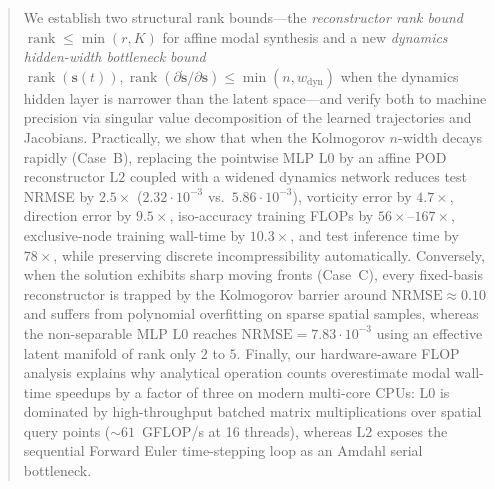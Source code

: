 \documentclass[10pt,a4paper]{article}
\newcommand{\NRMSE}{\mathrm{NRMSE}}
\begin{document}
\begin{abstract}
We establish two structural rank bounds---the \emph{reconstructor rank bound} $\operatorname{rank}\le\min(r,K)$ for affine modal synthesis and a new \emph{dynamics hidden-width bottleneck bound} $\operatorname{rank}(\mathbf{s}(t)),\operatorname{rank}(\partial\dot{\mathbf{s}}/\partial\mathbf{s})\le\min(n,w_{\mathrm{dyn}})$ when the dynamics hidden layer is narrower than the latent space---and verify both to machine precision via singular value decomposition of the learned trajectories and Jacobians. Practically, we show that when the Kolmogorov $n$-width decays rapidly (Case~B), replacing the pointwise MLP $\mathrm{L0}$ by an affine POD reconstructor $\mathrm{L2}$ coupled with a widened dynamics network reduces test NRMSE by $2.5\times$ ($2.32\cdot 10^{-3}$ vs.\ $5.86\cdot 10^{-3}$), vorticity error by $4.7\times$, direction error by $9.5\times$, iso-accuracy training FLOPs by $56\times$--$167\times$, exclusive-node training wall-time by $10.3\times$, and test inference time by $78\times$, while preserving discrete incompressibility automatically. Conversely, when the solution exhibits sharp moving fronts (Case~C), every fixed-basis reconstructor is trapped by the Kolmogorov barrier around $\NRMSE\approx 0.10$ and suffers from polynomial overfitting on sparse spatial samples, whereas the non-separable MLP $\mathrm{L0}$ reaches $\NRMSE = 7.83\cdot 10^{-3}$ using an effective latent manifold of rank only $2$ to $5$. Finally, our hardware-aware FLOP analysis explains why analytical operation counts overestimate modal wall-time speedups by a factor of three on modern multi-core CPUs: $\mathrm{L0}$ is dominated by high-throughput batched matrix multiplications over spatial query points ($\sim 61$~GFLOP/s at 16 threads), whereas $\mathrm{L2}$ exposes the sequential Forward Euler time-stepping loop as an Amdahl serial bottleneck.
\end{abstract}












\end{document}
